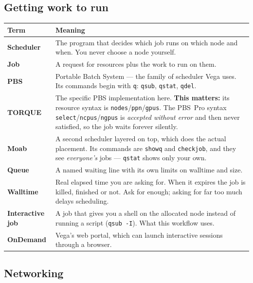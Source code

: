 \documentclass[11pt,a4paper]{article}
\begin{document}
\subsection{Getting work to run}

\begin{longtable}{@{}>{\raggedright\arraybackslash}p{3.5cm} p{11.6cm}@{}}
\toprule
\textbf{Term} & \textbf{Meaning} \\
\midrule
\endhead
\textbf{Scheduler} & The program that decides which job runs on which node and
when. You never choose a node yourself. \\
\textbf{Job} & A request for resources plus the work to run on them. \\
\textbf{PBS} & Portable Batch System --- the family of scheduler Vega uses. Its
commands begin with \texttt{q}: \texttt{qsub}, \texttt{qstat}, \texttt{qdel}. \\
\textbf{TORQUE} & The specific PBS implementation here. \textbf{This matters:}
its resource syntax is \texttt{nodes}/\texttt{ppn}/\texttt{gpus}. The
PBS~Pro syntax \texttt{select}/\texttt{ncpus}/\texttt{ngpus} is
\emph{accepted without error} and then never satisfied, so the job waits
forever silently. \\
\textbf{Moab} & A second scheduler layered on top, which does the actual
placement. Its commands are \texttt{showq} and \texttt{checkjob}, and they see
\emph{everyone's} jobs --- \texttt{qstat} shows only your own. \\
\textbf{Queue} & A named waiting line with its own limits on walltime and size.
\\
\textbf{Walltime} & Real elapsed time you are asking for. When it expires the
job is killed, finished or not. Ask for enough; asking for far too much delays
scheduling. \\
\textbf{Interactive job} & A job that gives you a shell on the allocated node
instead of running a script (\texttt{qsub -I}). What this workflow uses. \\
\textbf{OnDemand} & Vega's web portal, which can launch interactive sessions
through a browser. \\
\bottomrule
\end{longtable}

\subsection{Networking}
\end{document}
